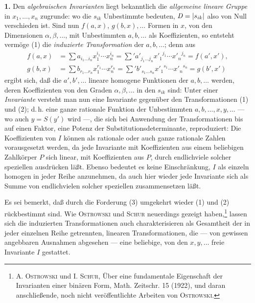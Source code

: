 \textbf{1.} Den \emph{algebraischen Invarianten} liegt bekanntlich die \emph{allgemeine lineare Gruppe} in $x_1,\ldots,x_n$ zugrunde:
wo die $s_{ik}$ Unbestimmte bedeuten, $\mathit D=|s_{ik}|$ also von Null verschieden ist. Sind nun $f(a,x)$, $g(b,x),\ldots$ Formen in $x$, von den Dimensionen $\alpha,\beta,\ldots$, mit Unbestimmten $a,b,\ldots$ als Koeffizienten, so entsteht vermöge (1) die \emph{induzierte Transformation} der $a,b,\ldots$; denn aus
\[
\begin{aligned}
f(a,x)&=\sum a_{i_1\ldots i_n}x_1^{i_1}\cdots x_n^{i_n}
      =\sum{}' a'_{j_1\ldots j_n}{x'_1}^{j_1}\cdots {x'_n}^{j_n}
      =f(a',x'),\\
g(b,x)&=\sum b_{r_1\ldots r_n}x_1^{r_1}\cdots x_n^{r_n}
      =\sum{}' b'_{s_1\ldots s_n}{x'_1}^{s_1}\cdots {x'_n}^{s_n}
      =g(b',x')
\end{aligned}
\]
ergibt sich, daß die $a',b',\ldots$ lineare homogene Funktionen der $a,b,\ldots$ werden, deren Koeffizienten von den Graden $\alpha,\beta,\ldots$ in den $s_{ik}$ sind:
Unter einer \emph{Invariante} versteht man nun eine Invariante gegenüber den Transformationen (1) und (2); d.\,h. eine ganze rationale Funktion der Unbestimmten $a,b,\ldots,x,y,\ldots$ --- wo auch $y=S(y')$ wird ---, die sich bei Anwendung der Transformationen bis auf einen Faktor, eine Potenz der Substitutionsdeterminante, reproduziert:
Die Koeffizienten von $I$ können als rationale oder auch ganze rationale Zahlen vorausgesetzt werden, da jede Invariante mit Koeffizienten aus einem beliebigen Zahlkörper $P$ sich linear, mit Koeffizienten aus $P$, durch endlichviele solcher speziellen ausdrücken läßt. Ebenso bedeutet es keine Einschränkung, $I$ als einzeln homogen in jeder Reihe anzunehmen, da auch hier wieder jede Invariante sich als Summe von endlichvielen solcher speziellen zusammensetzen läßt.

Es sei bemerkt, daß durch die Forderung (3) umgekehrt wieder (1) und (2) rückbestimmt sind. Wie \textsc{Ostrowski} und \textsc{Schur} neuerdings gezeigt haben,\footnote{A. \textsc{Ostrowski} und I. \textsc{Schur}, Über eine fundamentale Eigenschaft der Invarianten einer binären Form, Math. Zeitschr. 15 (1922), und daran anschließende, noch nicht veröffentlichte Arbeiten von \textsc{Ostrowski}.} lassen sich die induzierten Transformationen auch charakterisieren als Gesamtheit der in jeder einzelnen Reihe getrennten, linearen Transformationen, die --- von gewissen angebbaren Ausnahmen abgesehen --- eine beliebige, von den $x,y,\ldots$ freie Invariante $I$ gestattet.

